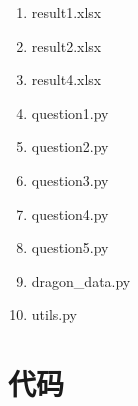 \documentclass[UTF-8,a4paper,zihao=-4]{ctexart}
\begin{document}
\begin{enumerate}
    \item result1.xlsx
    \item result2.xlsx
    \item result4.xlsx
    \item question1.py
    \item question2.py
    \item question3.py
    \item question4.py
    \item question5.py
    \item dragon\_data.py
    \item utils.py
\end{enumerate}

\section{代码}

















\end{document}
